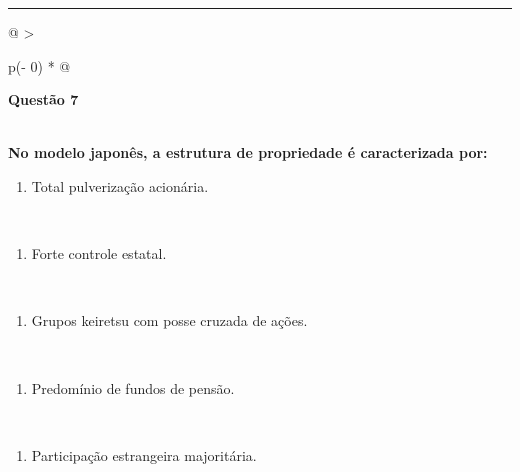 \documentclass[
]{book}
\providecommand{\tightlist}{%
  \setlength{\itemsep}{0pt}\setlength{\parskip}{0pt}}
\begin{document}
\begin{center}\rule{0.5\linewidth}{0.5pt}\end{center}

\begin{longtable}[]{@{}
  >{\raggedright\arraybackslash}p{(\columnwidth - 0\tabcolsep) * }@{}}
\toprule\noalign{}
\begin{minipage}[b]{\linewidth}\raggedright
\textbf{Questão 7}
\end{minipage} \\
\midrule\noalign{}
\endhead
\bottomrule\noalign{}
\endlastfoot
\textbf{No modelo japonês, a estrutura de propriedade é caracterizada por:} \\
\begin{minipage}[t]{\linewidth}\raggedright
\begin{enumerate}
\def\labelenumi{\alph{enumi})}
\tightlist
\item
  Total pulverização acionária.
\end{enumerate}
\end{minipage} \\
\begin{minipage}[t]{\linewidth}\raggedright
\begin{enumerate}
\def\labelenumi{\alph{enumi})}
\setcounter{enumi}{1}
\tightlist
\item
  Forte controle estatal.
\end{enumerate}
\end{minipage} \\
\begin{minipage}[t]{\linewidth}\raggedright
\begin{enumerate}
\def\labelenumi{\alph{enumi})}
\setcounter{enumi}{2}
\tightlist
\item
  Grupos keiretsu com posse cruzada de ações.
\end{enumerate}
\end{minipage} \\
\begin{minipage}[t]{\linewidth}\raggedright
\begin{enumerate}
\def\labelenumi{\alph{enumi})}
\setcounter{enumi}{3}
\tightlist
\item
  Predomínio de fundos de pensão.
\end{enumerate}
\end{minipage} \\
\begin{minipage}[t]{\linewidth}\raggedright
\begin{enumerate}
\def\labelenumi{\alph{enumi})}
\setcounter{enumi}{4}
\tightlist
\item
  Participação estrangeira majoritária.
\end{enumerate}
\end{minipage} \\
 \\
\end{longtable}
\end{document}
